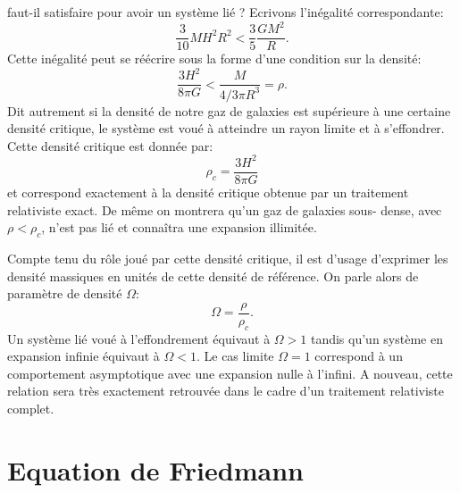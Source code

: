  faut-il satisfaire pour avoir un système lié ? Ecrivons l'inégalité correspondante:
\begin{equation}
\frac{3}{10} M H^2 R^2 <\frac{3}{5}\frac{GM^2}{R}.
\end{equation}
Cette inégalité peut se réécrire sous la forme d'une condition sur la densité:
\begin{equation}
\frac{3H^2}{8\pi G}< \frac{M}{4/3\pi R^3}=\rho.
\end{equation}
Dit autrement si la densité de notre gaz de galaxies est supérieure à une certaine densité critique, le système est voué à atteindre un rayon limite et à s'effondrer. Cette densité critique  est donnée par:
\begin{equation}
\rho_c =\frac{3H^2}{8\pi G}
\end{equation}
et correspond exactement à la densité critique obtenue par un traitement relativiste exact. De même on montrera qu'un gaz de galaxies sous- dense, avec $\rho< \rho_c$, n'est pas lié et  connaîtra une expansion illimitée. 

Compte tenu du rôle joué par cette densité critique, il est d'usage d'exprimer les densité massiques en unités de cette densité de référence. On parle alors de paramètre de densité  $\Omega$:
\begin{equation}
\Omega=\frac{\rho}{\rho_c}.
\end{equation}
Un système lié voué à l'effondrement équivaut à $\Omega>1$ tandis qu'un système en expansion infinie équivaut à $\Omega<1$. Le cas limite $\Omega=1$ correspond à un comportement asymptotique avec une expansion nulle à l'infini. A nouveau, cette relation sera très exactement retrouvée dans le cadre d'un traitement relativiste complet.

\section{Equation de Friedmann}

